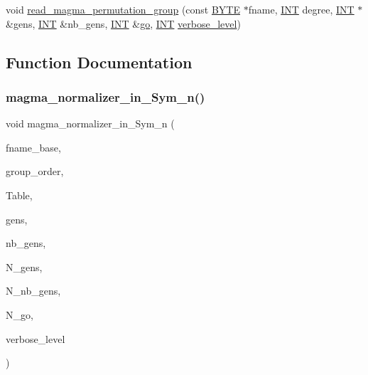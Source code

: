 \begin{DoxyCompactItemize}
void \mbox{\hyperlink{magma__interface_8_c_a58fde0545d69e8dbea05b2dd3f231b39}{read\+\_\+magma\+\_\+permutation\+\_\+group}} (const \mbox{\hyperlink{galois_8h_ab6cc7b4aeb6ea31aba2b3fbfc83ff5e6}{B\+Y\+TE}} $\ast$fname, \mbox{\hyperlink{galois_8h_a09fddde158a3a20bd2dcadb609de11dc}{I\+NT}} degree, \mbox{\hyperlink{galois_8h_a09fddde158a3a20bd2dcadb609de11dc}{I\+NT}} $\ast$\&gens, \mbox{\hyperlink{galois_8h_a09fddde158a3a20bd2dcadb609de11dc}{I\+NT}} \&nb\+\_\+gens, \mbox{\hyperlink{galois_8h_a09fddde158a3a20bd2dcadb609de11dc}{I\+NT}} \&\mbox{\hyperlink{simeon_8_c_a1516b736c8ebbfb03a9dd7d8826cd9a6}{go}}, \mbox{\hyperlink{galois_8h_a09fddde158a3a20bd2dcadb609de11dc}{I\+NT}} \mbox{\hyperlink{simeon_8_c_a818073fbcc2f439e7c56952f67386122}{verbose\+\_\+level}})
\end{DoxyCompactItemize}


\subsection{Function Documentation}
\mbox{\label{magma__interface_8_c_aa2528f65b43c2ceade89234d07fe58c9}} 
\subsubsection{\texorpdfstring{magma\+\_\+normalizer\+\_\+in\+\_\+\+Sym\+\_\+n()}{magma\_normalizer\_in\_Sym\_n()}}
{\footnotesize\ttfamily void magma\+\_\+normalizer\+\_\+in\+\_\+\+Sym\+\_\+n (\begin{DoxyParamCaption}\item[{const \mbox{\hyperlink{galois_8h_ab6cc7b4aeb6ea31aba2b3fbfc83ff5e6}{B\+Y\+TE}} $\ast$}]{fname\+\_\+base,  }\item[{\mbox{\hyperlink{galois_8h_a09fddde158a3a20bd2dcadb609de11dc}{I\+NT}}}]{group\+\_\+order,  }\item[{\mbox{\hyperlink{galois_8h_a09fddde158a3a20bd2dcadb609de11dc}{I\+NT}} $\ast$}]{Table,  }\item[{\mbox{\hyperlink{galois_8h_a09fddde158a3a20bd2dcadb609de11dc}{I\+NT}} $\ast$}]{gens,  }\item[{\mbox{\hyperlink{galois_8h_a09fddde158a3a20bd2dcadb609de11dc}{I\+NT}}}]{nb\+\_\+gens,  }\item[{\mbox{\hyperlink{galois_8h_a09fddde158a3a20bd2dcadb609de11dc}{I\+NT}} $\ast$\&}]{N\+\_\+gens,  }\item[{\mbox{\hyperlink{galois_8h_a09fddde158a3a20bd2dcadb609de11dc}{I\+NT}} \&}]{N\+\_\+nb\+\_\+gens,  }\item[{\mbox{\hyperlink{galois_8h_a09fddde158a3a20bd2dcadb609de11dc}{I\+NT}} \&}]{N\+\_\+go,  }\item[{\mbox{\hyperlink{galois_8h_a09fddde158a3a20bd2dcadb609de11dc}{I\+NT}}}]{verbose\+\_\+level }\end{DoxyParamCaption})}

